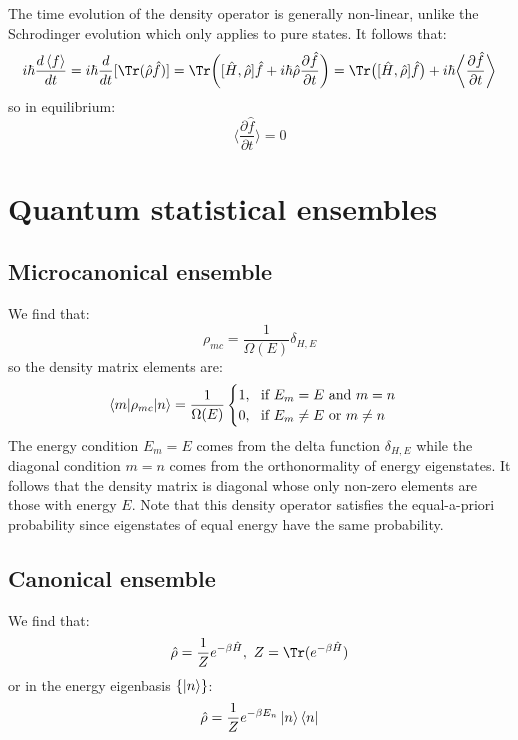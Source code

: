 \documentclass[a4paper,11pt,oneside]{book}
\begin{document}
The time evolution of the density operator is generally non-linear, unlike the Schrodinger evolution which only applies to pure states. It follows that:
\begin{align}
    i \hbar \frac{d\braket{f}}{dt} = i\hbar \frac{d}{dt}[\Tr (\hat{\rho}\hat{f})]= \Tr \bigg([\hat{H},\hat{\rho}] \hat{f} + i\hbar \hat{\rho} \frac{\partial \hat{f}}{\partial t}\bigg)=\Tr \big([\hat{H},\hat{\rho}] \hat{f} \big) + i \hbar \bigg\langle\frac{\partial \hat{f}}{\partial t}\bigg \rangle
\end{align}
so in equilibrium:
\begin{equation}
\bigg\langle\frac{\partial \hat{f}}{\partial t}\bigg \rangle = 0
\end{equation}
\section{Quantum statistical ensembles}
\subsection*{Microcanonical ensemble}
We find that:
\begin{equation}
    \rho_{mc} = \frac{1}{\Omega(E)} \delta_{H,E}  
\end{equation}
so the density matrix elements are:
\begin{equation}
    \braket{m|\rho_{mc}|n} = \frac{1}{\Omega(E)}\begin{cases}
    1, \ \text{ if } E_m=E \text{ and } m=n\\
    0, \ \text{ if } E_m \neq E \text{ or } m \neq n
    \end{cases}
\end{equation}
The energy condition $E_m=E$ comes from the delta function $\delta_{H,E}$ while the diagonal condition $m=n$ comes from the orthonormality of energy eigenstates. It follows that the density matrix is diagonal whose only non-zero elements are those with energy $E$. Note that this density operator satisfies the equal-a-priori probability since eigenstates of equal energy have the same probability.
\subsection*{Canonical ensemble}
We find that:
\begin{equation}
    \hat{\rho} = \frac{1}{Z} e^{-\beta \hat{H}}, \ Z = \Tr (e^{-\beta \hat{H}})
\end{equation}
or in the energy eigenbasis $\{\ket{n}\}$:
\begin{equation}
     \hat{\rho} = \frac{1}{Z} e^{-\beta E_n}\ket{n}\bra{n}
\end{equation}
\end{document}
